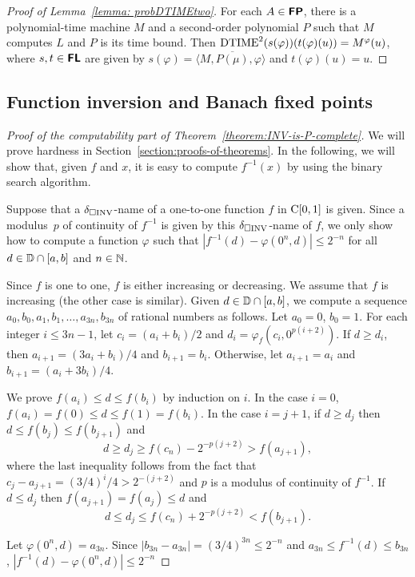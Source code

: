 \documentclass[a4paper,UKenglish]{lipics}
\begin{document}
\begin{proof}[Proof of Lemma~\ref{lemma: probDTIMEtwo}]
 For each $A \in \text{\bfseries \sffamily \upshape FP}$, 
 there is a polynomial-time machine $M$ 
 and a second-order polynomial $P$ 
 such that $M$ computes $L$ and $P$ is its time bound. 
 Then $\mathrm{DTIME}^2(s(\varphi))(t(\varphi)(u)) = M^\varphi (u)$, 
 where 
 $s, t \in \text{\bfseries \sffamily \upshape FL}$ are given by 
 $s(\varphi) = \langle M, \overline{P(\mu)}, \varphi \rangle$ and 
 $t(\varphi)(u) = u$.
\end{proof}

\subsection{Function inversion and Banach fixed points}

\begin{proof}[Proof of the computability part of Theorem~\ref{theorem:INV-is-P-complete}]
We will prove hardness in Section~\ref{section:proofs-of-theorems}.
In the following, we will show that, 
given $f$ and $x$, 
it is easy to compute $f^{-1}(x)$ by using the binary search algorithm.

Suppose that a $\delta _{\square \mathrm{INV}}$-name of a one-to-one function $f$ in $\mathrm C [0, 1]$ is given. 
Since a modulus~$p$ of continuity of $f ^{-1}$ is given by this $\delta _{\square \mathrm{INV}}$-name of $f$,
we only show how to compute a function $\varphi$ such that 
$|f^{-1}(d) - \varphi(0^n, d)| \le 2^{-n}$ for all $d \in \mathbb D \cap [a, b]$ and $n \in \mathbb N$.

Since $f$ is one to one, $f$ is either increasing or decreasing. 
We assume that $f$ is increasing (the other case is similar).
Given $d \in \mathbb D \cap [a, b]$, 
we compute a sequence  $a_0, b_0, a_1,b_1, \dots, a_{3n}, b_{3n}$ of rational numbers as follows.
Let $a_0 = 0$, $b_0 = 1$.
For each integer $i \le 3n-1$,
let $c_i = (a_i+b_i)/2$ and $d_i = \varphi_f(c_i, 0^{p(i+2)})$.
If $d \ge d_i$, then $a_{i+1} = (3a_i+b_i)/4$ and $b_{i+1} = b_i$. 
Otherwise, let $a_{i+1} = a_i$ and $b_{i+1} = (a_i+3b_i)/4$.

We prove $f(a_i) \leq d \leq f(b_i)$ by induction on $i$.
In the case $i = 0$, $f(a_i) = f(0) \le d \le f(1) = f(b_i)$.
In the case $i=j+1$, if $d \ge d_j$ then $d \le f(b_j) \le f(b_{j+1})$ and
\begin{equation}
 d \ge d_j \ge f(c_n) - 2^{-p(j+2)} > f(a_{j+1}),
\end{equation}
where the last inequality follows from the fact that $c_j - a_{j+1} = (3/4)^i/4 > 2^{-(j+2)}$ and $p$ is a modulus of continuity of $f^{-1}$.
If $d \le d_j$ then $f(a_{j+1}) = f(a_j) \le d$ and 
\begin{equation}
 d \le d_j \le f(c_n) + 2^{-p(j+2)} < f(b_{j+1}).
\end{equation}

Let $\varphi(0^n, d) = a_{3n}$.
Since $|b_{3n} - a_{3n}| = (3/4)^{3n} \le 2^{-n}$ and
$a_{3n} \le f^{-1}(d) \le b_{3n}$,
$|f^{-1}(d) - \varphi(0^n, d)| \le 2^{-n}$
\end{proof}
\end{document}
